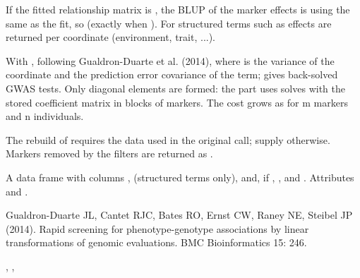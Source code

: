 \documentclass[a4paper]{book}
\begin{document}
\begin{Details}\relax
If the fitted relationship matrix is , the
BLUP of the marker effects is
using the same  as the fit, so 
(exactly  when ). For structured terms such as
 effects are returned per coordinate
(environment, trait, ...).

With , following Gualdron-Duarte et al. (2014),
where  is the variance of the coordinate and  the
prediction error covariance of the term;  gives
back-solved GWAS tests. Only diagonal elements are formed: the 
part uses solves with the stored coefficient matrix in blocks of 
markers. The cost grows as  for m markers and n individuals.

The rebuild of  requires the data used in the original call; supply
 otherwise. Markers removed by the filters are returned as .
\end{Details}
%
\begin{Value}
A data frame with columns ,  (structured
terms only),  and, if , ,  and
. Attributes  and .
\end{Value}
%
\begin{References}\relax
Gualdron-Duarte JL, Cantet RJC, Bates RO, Ernst CW, Raney NE, Steibel JP (2014).
Rapid screening for phenotype-genotype associations by linear transformations
of genomic evaluations. BMC Bioinformatics 15: 246.
\end{References}
%
\begin{SeeAlso}\relax
{}, , 
\end{SeeAlso}
%
\begin{Examples}
\end{Examples}
\end{document}
